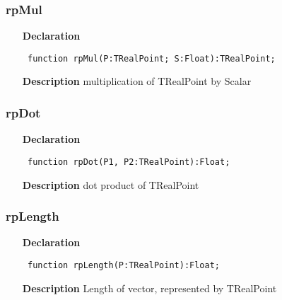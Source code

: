 \documentclass[12pt,a4paper,oneside]{report}
\newcommand{\declarationitem}[1]{\textbf{#1}}
\newcommand{\descriptiontitle}[1]{\textbf{#1}}
\newcommand{\code}[1]{\texttt{#1}}
\begin{document}
\subsubsection{rpMul}
\label{uRealPoints-rpMul}
\begin{itemize}\item[\declarationitem{Declaration}\hfill]
\begin{flushleft}
\code{
function rpMul(P:TRealPoint; S:Float):TRealPoint;}

\end{flushleft}

\par
\item[\descriptiontitle{Description}]
multiplication of TRealPoint by Scalar

\end{itemize}
\subsubsection{rpDot}
\label{uRealPoints-rpDot}
\begin{itemize}\item[\declarationitem{Declaration}\hfill]
\begin{flushleft}
\code{
function rpDot(P1, P2:TRealPoint):Float;}

\end{flushleft}

\par
\item[\descriptiontitle{Description}]
dot product of TRealPoint

\end{itemize}
\subsubsection{rpLength}
\label{uRealPoints-Length}
\begin{itemize}\item[\declarationitem{Declaration}\hfill]
\begin{flushleft}
\code{
function rpLength(P:TRealPoint):Float;}

\end{flushleft}

\par
\item[\descriptiontitle{Description}]
Length of vector, represented by TRealPoint

\end{itemize}
\end{document}
